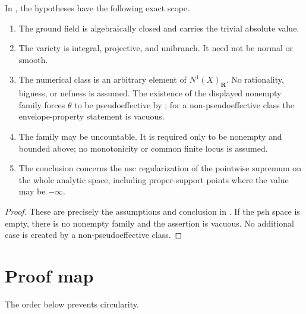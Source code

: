 \begin{proposition}\label{prop:bj-final-hypothesis-ledger}
In , the hypotheses have the following exact
scope.
\begin{enumerate}
\item The ground field is algebraically closed and carries the trivial
      absolute value.
\item The variety is integral, projective, and unibranch.  It need not be
      normal or smooth.
\item The numerical class is an arbitrary element of
      $N^1(X)_{\mathbf R}$.  No rationality, bigness, or nefness is
      assumed.  The existence of the displayed nonempty family forces
      $\theta$ to be pseudoeffective by
      ; for a non-pseudoeffective class the
      envelope-property statement is vacuous.
\item The family may be uncountable.  It is required only to be nonempty
      and bounded above; no monotonicity or common finite locus is assumed.
\item The conclusion concerns the usc regularization of the pointwise
      supremum on the whole analytic space, including proper-support
      points where the value may be $-\infty$.
\end{enumerate}
\par
\end{proposition}

\begin{proof}
These are precisely the assumptions and conclusion in
.  If the psh space is empty, there is no
nonempty family and the assertion is vacuous.  No additional case is
created by a non-pseudoeffective class.
\end{proof}

\section{Proof map}
\label{sec:ch37-proof-map}

The order below prevents circularity.


